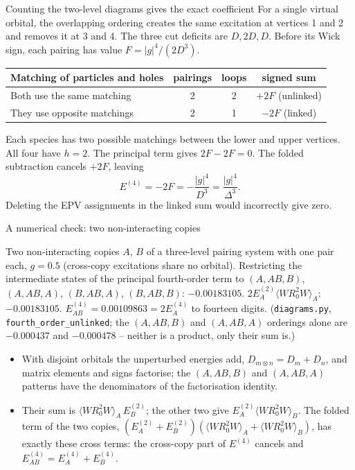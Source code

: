 \documentclass[aspectratio=169,10pt]{beamer}
\newcommand{\numbox}[1]{%
  \begin{tcolorbox}[colback=palegreen,colframe=teal!70!black,title={\bfseries Measured}]
  #1
  \end{tcolorbox}}
\begin{document}
\begin{frame}{Counting the two-level diagrams gives the exact coefficient}
For a single virtual orbital, the overlapping ordering creates the same excitation at vertices 1 and 2 and removes it at 3 and 4. The three cut deficits are $D,2D,D$. Before its Wick sign, each pairing has value $F=|g|^4/(2D^3)$.
\begin{center}
\begin{tabular}{lccc}
\toprule
Matching of particles and holes & pairings & loops & signed sum \\
\midrule
Both use the same matching & 2 & 2 & $+2F$ (unlinked) \\
They use opposite matchings & 2 & 1 & $-2F$ (linked) \\
\bottomrule
\end{tabular}
\end{center}
Each species has two possible matchings between the lower and upper vertices. All four have $h=2$. The principal term gives $2F-2F=0$. The folded subtraction cancels $+2F$, leaving
\[
 E^{(4)}=-2F=-\frac{|g|^4}{D^3}=\frac{|g|^4}{\Delta^3}.
\]
Deleting the EPV assignments in the linked sum would incorrectly give zero.
\end{frame}

\begin{frame}{A numerical check: two non-interacting copies}
\numbox{Two non-interacting copies \(A\), \(B\) of a three-level pairing system with one pair each, \(g=0.5\) (cross-copy excitations share no orbital). Restricting the intermediate states of the principal fourth-order term to \((A,AB,B)\), \((A,AB,A)\), \((B,AB,A)\), \((B,AB,B)\): \(-0.00183105\). \(2E^{(2)}_A\langle WR_0^2W\rangle_A\): \(-0.00183105\). \(E^{(4)}_{AB}=0.00109863=2E^{(4)}_A\) to fourteen digits. (\texttt{diagrams.py}, \texttt{fourth\_order\_unlinked}; the \((A,AB,B)\) and \((A,AB,A)\) orderings alone are \(-0.000437\) and \(-0.000478\) -- neither is a product, only their sum is.)}
\begin{itemize}
\item With disjoint orbitals the unperturbed energies add, \(D_{m\otimes n}=D_m+D_n\), and matrix elements and signs factorise; the \((A,AB,B)\) and \((A,AB,A)\) patterns have the denominators of the factorisation identity.
\item Their sum is \(\langle WR_0^2W\rangle_A\,E^{(2)}_B\); the other two give \(E^{(2)}_A\langle WR_0^2W\rangle_B\). The folded term of the two copies, \((E^{(2)}_A+E^{(2)}_B)(\langle WR_0^2W\rangle_A+\langle WR_0^2W\rangle_B)\), has exactly these cross terms: the cross-copy part of \(E^{(4)}\) cancels and \(E^{(4)}_{AB}=E^{(4)}_A+E^{(4)}_B\).
\end{itemize}
\end{frame}
\end{document}
